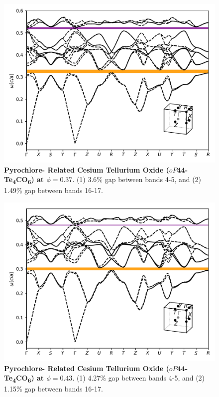 \documentclass[fleqn,amsmath,amssymb,superscriptaddress, reprint,prl]{revtex4-1}
\begin{document}
\begin{figure}
\includegraphics[width=0.9\linewidth]{workspace/1563e583794690e0dd79d3b6d35d7618/images/r=15.pdf}
	\caption{\textbf{Pyrochlore- Related Cesium Tellurium Oxide ($oP$44-Te\textsubscript{4}CO\textsubscript{6}) at $\phi=0.37$}. (1) 3.6\% gap between bands 4-5, and (2) 1.49\% gap between bands 16-17.}
\end{figure}

\begin{figure}
\includegraphics[width=0.9\linewidth]{workspace/1563e583794690e0dd79d3b6d35d7618/images/r=16.pdf}
	\caption{\textbf{Pyrochlore- Related Cesium Tellurium Oxide ($oP$44-Te\textsubscript{4}CO\textsubscript{6}) at $\phi=0.43$}. (1) 4.27\% gap between bands 4-5, and (2) 1.15\% gap between bands 16-17.}
\end{figure}
\end{document}

